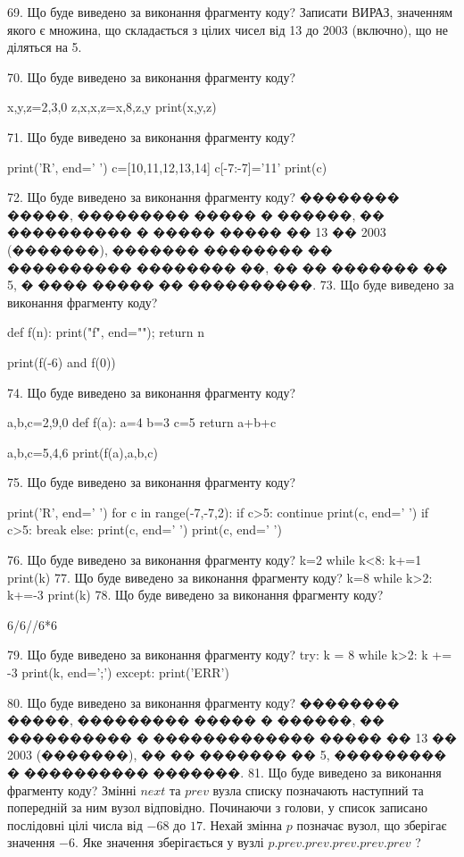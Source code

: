 \documentclass[11pt]{article}
\begin{document}
69. Що буде виведено за виконання фрагменту коду?
Записати ВИРАЗ, значенням якого є множина, що складається з цілих чисел від 13 до 2003 (включно), що не діляться на 5.

70. Що буде виведено за виконання фрагменту коду?

x,y,z=2,3,0
z,x,x,z=x,8,z,y
print(x,y,z)

71. Що буде виведено за виконання фрагменту коду?

print('R', end=' ')
c=[10,11,12,13,14]
c[-7:-7]='11'
print(c)


72. Що буде виведено за виконання фрагменту коду?
�������� �����, ��������� ����� � ������, �� ���������� � ����� ����� �� 13 �� 2003 (�������), ������� �������� �� ���������� �������� ��, �� �� ������� �� 5, � ���� ����� �� ����������.
73. Що буде виведено за виконання фрагменту коду?

def f(n):
    print("f", end="");
    return n

print(f(-6) and f(0))

74. Що буде виведено за виконання фрагменту коду?

a,b,c=2,9,0
def f(a):
    a=4
    b=3
    c=5
    return a+b+c

a,b,c=5,4,6
print(f(a),a,b,c)

75. Що буде виведено за виконання фрагменту коду?

print('R', end=' ')
for c in range(-7,-7,2):
    if c>5:
        continue
        print(c, end=' ')
    if c>5:
        break
    else:
        print(c, end=' ')
    print(c, end=' ')

76. Що буде виведено за виконання фрагменту коду?
k=2
   while k<8: k+=1
   print(k)
77. Що буде виведено за виконання фрагменту коду?
k=8
   while k>2: k+=-3
   print(k)
78. Що буде виведено за виконання фрагменту коду?

6/6//6*6

79. Що буде виведено за виконання фрагменту коду?
try:
    k = 8
    while k>2:
        k += -3
    print(k, end=';')
except:
    print('ERR')

80. Що буде виведено за виконання фрагменту коду?
�������� �����, ��������� ����� � ������, �� ���������� � ������������� ����� �� 13 �� 2003 (�������), �� �� ������� �� 5, ��������� � ���������� �������.
81. Що буде виведено за виконання фрагменту коду?
Змінні $next$ та $prev$ вузла списку позначають наступний та попередній за ним вузол відповідно. Починаючи з голови, у список записано послідовні цілі числа від $-68$ до $17$. Нехай змінна $p$ позначає вузол, що зберігає значення $-6$.
Яке значення зберігається у вузлі $p.prev.prev.prev.prev.prev$ ?
\end{document}
